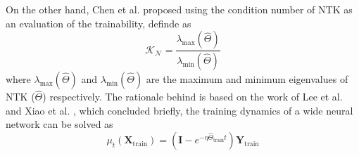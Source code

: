 \documentclass[sigconf]{acmart}
\begin{document}
    On the other hand, Chen et al. proposed using the condition number of NTK 
    as an evaluation of the trainability, definde as
    \begin{equation}
        \mathcal{K_N}=\frac{\lambda_{\textrm{max}}(\hat\Theta)}{\lambda_{\textrm{min}}(\hat\Theta)}
    \end{equation}
    where $\lambda_{\textrm{max}}(\hat\Theta)$ and $\lambda_{\textrm{min}}(\hat\Theta)$ 
    are the maximum and minimum eigenvalues of NTK ($\hat\Theta$) respectively.
    The rationale behind is based on the work of Lee et al. \cite{Lee_2020} and 
    Xiao et al. \cite{DBLP:journals/corr/abs-1912-13053}, which concluded briefly, 
    the training dynamics of a wide neural network can be solved as 
    \begin{equation}
        \mu_t(\textbf{X}_{\textrm{train}})=(\textbf{I}-e^{-\eta\hat\Theta_{\textrm{train}}t})\textbf{Y}_{\textrm{train}}
    \end{equation}


    
    
\end{document}
